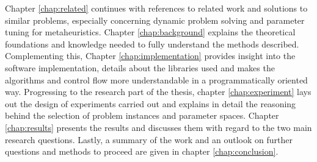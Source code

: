 Chapter \ref{chap:related} continues with references to related work and solutions to similar problems, especially concerning dynamic problem solving and parameter tuning for metaheuristics.
Chapter \ref{chap:background} explains the theoretical foundations and knowledge needed to fully understand the methods described.
Complementing this, Chapter \ref{chap:implementation} provides insight into the software implementation, details about the libraries used and makes the algorithms and control flow more understandable in a programmatically oriented way.
Progressing to the research part of the thesis, chapter \ref{chap:experiment} lays out the design of experiments carried out and explains in detail the reasoning behind the selection of problem instances and parameter spaces.
Chapter \ref{chap:results} presents the results and discusses them with regard to the two main research questions.
Lastly, a summary of the work and an outlook on further questions and methods to proceed are given in chapter \ref{chap:conclusion}.






